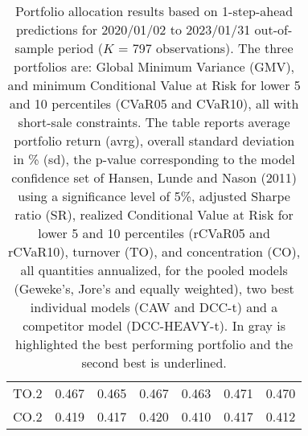 \begin{table}[ht]
{\begin{tabular}{lccc|ccc}
  TO.2 & 0.467 & 0.465 & 0.467 & 0.463 & 0.471 & 0.470 \\ 
  CO.2 & 0.419 & 0.417 & 0.420 & 0.410 & 0.417 & 0.412 \\ 
   \hline
\end{tabular}
}
\caption{Portfolio allocation results based on 1-step-ahead
              predictions for 2020/01/02 to 2023/01/31 out-of-sample period ($K$ = 797 observations).
              The three portfolios are:
             Global Minimum Variance (GMV), and minimum Conditional Value at Risk
             for lower 5 and 10 percentiles (CVaR05 and CVaR10), all with short-sale constraints.
             The table reports average portfolio return (avrg),
             overall standard deviation in \% (sd),
             the p-value corresponding to the model confidence set of
             Hansen, Lunde and Nason (2011) using a significance level of 5\%,
             adjusted Sharpe ratio (SR), realized Conditional Value at Risk
             for lower 5 and 10 percentiles  (rCVaR05 and rCVaR10),
             turnover (TO), and concentration (CO), all quantities annualized, for the
             pooled models (Geweke's, Jore's and
             equally weighted),
            two best individual models (CAW  and DCC-t) and a competitor model (DCC-HEAVY-t).
            In gray is highlighted the best performing portfolio and the second best is underlined.} 
\label{table:gmvfull_FX_new2}
\end{table}

